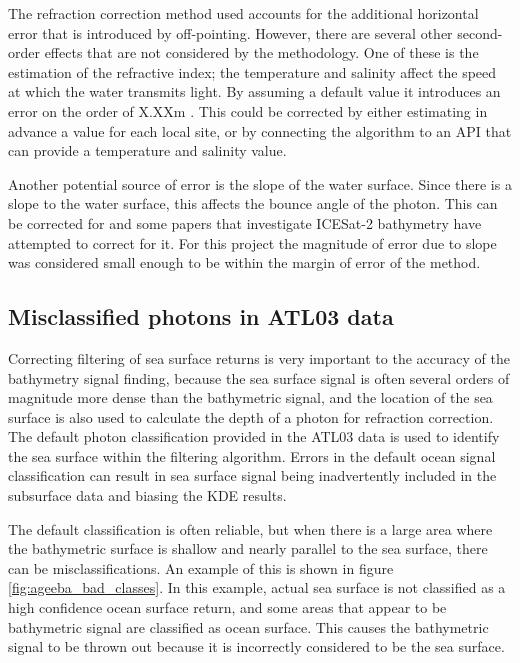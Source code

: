 The refraction correction method used accounts for the additional horizontal error that is introduced by off-pointing. However, there are several other second-order effects that are not considered by the methodology. One of these is the estimation of the refractive index; the temperature and salinity affect the speed at which the water transmits light. By assuming a default value it introduces an error on the order of X.XXm . This could be corrected by either estimating in advance a value for each local site, or by connecting the algorithm to an API that can provide a temperature and salinity value. 

Another potential source of error is the slope of the water surface. Since there is a slope to the water surface, this affects the bounce angle of the photon. This can be corrected for and some papers that investigate ICESat-2 bathymetry have attempted to correct for it. For this project the magnitude of error due to slope was considered small enough to be within the margin of error of the method.

\subsection{Misclassified photons in ATL03 data}

Correcting filtering of sea surface returns is very important to the accuracy of the bathymetry signal finding, because the sea surface signal is often several orders of magnitude more dense than the bathymetric signal, and the location of the sea surface is also used to calculate the depth of a photon for refraction correction. The default photon classification provided in the ATL03 data is used to identify the sea surface within the filtering algorithm. Errors in the default ocean signal classification can result in sea surface signal being inadvertently included in the subsurface data and biasing the KDE results.

The default classification is often reliable, but when there is a large area where the bathymetric surface is shallow and nearly parallel to the sea surface, there can be misclassifications. An example of this is shown in figure \ref{fig:ageeba_bad_classes}. In this example, actual sea surface is not classified as a high confidence ocean surface return, and some areas that appear to be bathymetric signal are classified as ocean surface. This causes the bathymetric signal to be thrown out because it is incorrectly considered to be the sea surface.

